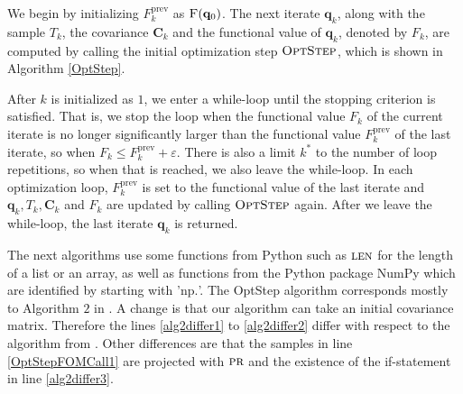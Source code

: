 We begin by initializing $F^\mathrm{prev}_{k}$ as $\Call{F}{\mathbf{q}_0}$. The next iterate $\mathbf{q}_k$, along with the sample $T_k$, the covariance $\mathbf{C}_k$ and the functional value of $\mathbf{q}_k$, denoted by $F_k$, are computed by calling the initial optimization step $\textproc{OptStep}$, which is shown in Algorithm \ref{OptStep}.

After $k$ is initialized as $1$, we enter a while-loop until the stopping criterion is satisfied. That is, we stop the loop when the functional value $F_k$ of the current iterate is no longer significantly larger than the functional value $F^\mathrm{prev}_k$ of the last iterate, so when $F_k\leq F^\mathrm{prev}_k+\varepsilon$. There is also a limit $k^*$ to the number of loop repetitions, so when that is reached, we also leave the while-loop. In each optimization loop, $F^\mathrm{prev}_{k}$ is set to the functional value of the last iterate and $\mathbf{q}_k,T_k,\mathbf{C}_k$ and $F_k$ are updated by calling $\textproc{OptStep}$ again. After we leave the while-loop, the last iterate $\mathbf{q}_k$ is returned.

The next algorithms use some functions from Python such as $\textproc{len}$ for the length of a list or an array, as well as functions from the Python package NumPy which are identified by starting with '$\mathrm{np.}$'. The OptStep algorithm corresponds mostly to Algorithm $2$ in \cite{Keil2022-dj}. A change is that our algorithm can take an initial covariance matrix. Therefore the lines \ref{alg2differ1} to \ref{alg2differ2} differ with respect to the algorithm from \cite{Keil2022-dj}. Other differences are that the samples in line \ref{OptStepFOMCall1} are projected with $\textproc{pr}$ and the existence of the if-statement in line \ref{alg2differ3}.

